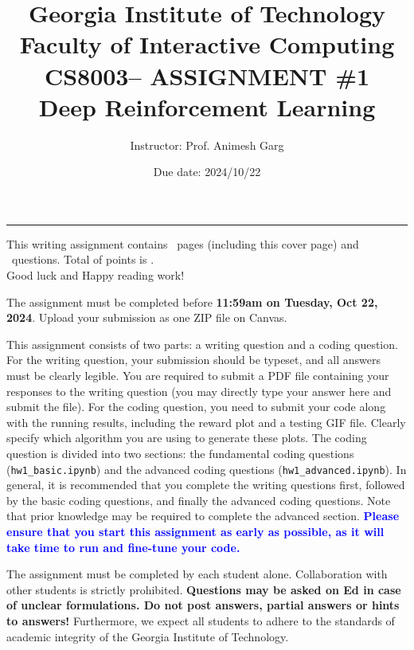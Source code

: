 \documentclass[letterpaper,12pt,addpoints]{exam}
\newcommand{\university}{Georgia Institute of Technology}
\newcommand{\faculty}{Faculty of Interactive Computing}
\newcommand{\class}{CS8003}
\newcommand{\examnum}{ASSIGNMENT \#1}
\newcommand{\content}{Deep Reinforcement Learning}
\newcommand{\examdate}{2024/10/22}
\begin{document}
\title{\Large \textbf{\university\\ \faculty\\
\bigskip
\class -- \examnum \\ \content}}
\author{Instructor: Prof. Animesh Garg}
\date{Due date: \examdate}

\maketitle
\begin{flushleft}
\medskip
{}
\end{flushleft}
\noindent \rule{\textwidth}{1pt}

\noindent This writing assignment contains \numpages\ pages (including this cover page) and \numquestions\ questions. Total of points is \numpoints.\\
Good luck and Happy reading work!

\vspace{15pt}

The assignment must be completed before \textbf{11:59am on Tuesday, Oct 22, 2024}. Upload your submission as one ZIP file on Canvas. 

This assignment consists of two parts: a writing question and a coding question. For the writing question, your submission should be typeset, and all answers must be clearly legible. You are required to submit a PDF file containing your responses to the writing question (you may directly type your answer here and submit the file). For the coding question, you need to submit your code along with the running results, including the reward plot and a testing GIF file. Clearly specify which algorithm you are using to generate these plots. The coding question is divided into two sections: the fundamental coding questions (\texttt{hw1\_basic.ipynb}) and the advanced coding questions (\texttt{hw1\_advanced.ipynb}). In general, it is recommended that you complete the writing questions first, followed by the basic coding questions, and finally the advanced coding questions. Note that prior knowledge may be required to complete the advanced section. \textbf{\textcolor{blue}{Please ensure that you start this assignment as early as possible, as it will take time to run and fine-tune your code.}}



The assignment must be completed by each student alone. Collaboration with other students is strictly prohibited. 
\textbf{
Questions may be asked on Ed in case of unclear formulations. Do not post answers, partial answers or hints to answers!} Furthermore, we expect all students to adhere to the standards of academic integrity of the Georgia Institute of Technology. 
\end{document}
